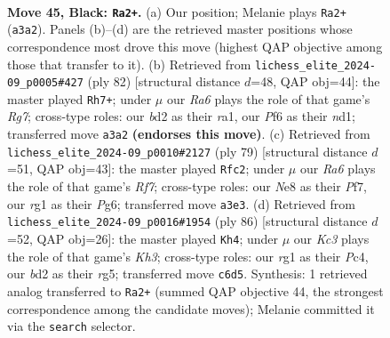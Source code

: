 \documentclass[11pt]{article}
\begin{document}
\clearpage

\begin{figure}[p]\centering
\begin{subfigure}{0.46\textwidth}\centering
\resizebox{\linewidth}{!}{%
\newchessgame
\chessboard[
  setfen={4n3/p1p5/2k2p2/8/r4P1R/r7/1K1B3P/5BR1 b - - 0 45},
  showmover=false,
  pgfstyle=straightmove, color=movearrow, markmove={a3-a2}
]}
\caption{}
\end{subfigure}\hfill
\begin{subfigure}{0.46\textwidth}\centering
\resizebox{\linewidth}{!}{%
\newchessgame
\chessboard[
  setfen={7k/R5R1/5r1p/4N3/8/p3P1KP/6P1/r2n4 w - - 1 42},
  showmover=false,
  pgfstyle=straightmove, color=movearrow, markmove={g7-h7}
]}
\caption{}
\end{subfigure}
\\[4pt]
\begin{subfigure}{0.46\textwidth}\centering
\resizebox{\linewidth}{!}{%
\newchessgame
\chessboard[
  setfen={1R6/5pk1/1P4p1/8/3P3P/6P1/br3r2/4R1KB b - - 1 40},
  showmover=false,
  pgfstyle=straightmove, color=movearrow, markmove={f2-c2}
]}
\caption{}
\end{subfigure}\hfill
\begin{subfigure}{0.46\textwidth}\centering
\resizebox{\linewidth}{!}{%
\newchessgame
\chessboard[
  setfen={r7/1b3k2/3p1n2/p5r1/1pPN4/1P5K/8/R3R3 w - - 2 44},
  showmover=false,
  pgfstyle=straightmove, color=movearrow, markmove={h3-h4}
]}
\caption{}
\end{subfigure}
\caption{\textbf{Move 45, Black: \texttt{Ra2+}.} (a) Our position; Melanie plays \texttt{Ra2+} (\texttt{a3a2}). Panels (b)--(d) are the retrieved master positions whose correspondence most drove this move (highest QAP objective among those that transfer to it). (b) Retrieved from \texttt{lichess\_elite\_2024-09\_p0005\#427} (ply 82) [structural distance $d$=48, QAP obj=44]: the master played \texttt{Rh7+}; under $\mu$ our \emph{Ra6} plays the role of that game's \emph{Rg7}; cross-type roles: our \emph{b}d2 as their \emph{r}a1, our \emph{P}f6 as their \emph{n}d1; transferred move \texttt{a3a2} \textbf{(endorses this move)}. (c) Retrieved from \texttt{lichess\_elite\_2024-09\_p0010\#2127} (ply 79) [structural distance $d$=51, QAP obj=43]: the master played \texttt{Rfc2}; under $\mu$ our \emph{Ra6} plays the role of that game's \emph{Rf7}; cross-type roles: our \emph{N}e8 as their \emph{P}f7, our \emph{r}g1 as their \emph{P}g6; transferred move \texttt{a3e3}. (d) Retrieved from \texttt{lichess\_elite\_2024-09\_p0016\#1954} (ply 86) [structural distance $d$=52, QAP obj=26]: the master played \texttt{Kh4}; under $\mu$ our \emph{Kc3} plays the role of that game's \emph{Kh3}; cross-type roles: our \emph{r}g1 as their \emph{P}c4, our \emph{b}d2 as their \emph{r}g5; transferred move \texttt{c6d5}. Synthesis: 1 retrieved analog transferred to \texttt{Ra2+} (summed QAP objective 44, the strongest correspondence among the candidate moves); Melanie committed it via the \texttt{search} selector.}
\label{fig:thought-m89}
\end{figure}
\end{document}

